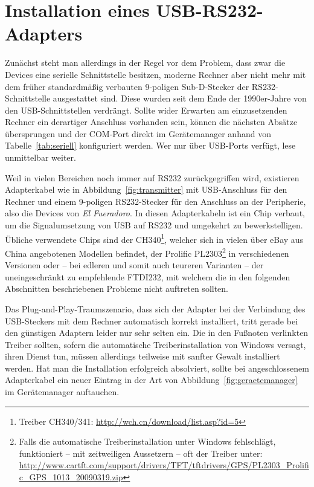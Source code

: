 \documentclass[pdftex, parskip, numbers=noenddot, toc=listof]{scrbook}
\newcommand{\anlage}{\emph{El Fueradoro}}
\begin{document}
		\section{Installation eines USB-RS232-Adapters}
			\label{sec:usbadapter}

			Zunächst steht man allerdings in der Regel vor dem Problem, dass zwar die Devices eine serielle Schnittstelle besitzen, moderne Rechner aber nicht mehr mit dem früher standardmäßig verbauten 9-poligen Sub-D-Stecker der RS232-Schnittstelle ausgestattet sind. Diese wurden seit dem Ende der 1990er-Jahre von den USB-Schnittstellen verdrängt. Sollte wider Erwarten am einzusetzenden Rechner ein derartiger Anschluss vorhanden sein, können die nächsten Absätze übersprungen und der COM-Port direkt im Gerätemanager anhand von Tabelle~\ref{tab:seriell} konfiguriert werden. Wer nur über USB-Ports verfügt, lese unmittelbar weiter.

			Weil in vielen Bereichen noch immer auf RS232 zurückgegriffen wird, existieren Adapterkabel wie in Abbildung~\ref{fig:transmitter} mit USB-Anschluss für den Rechner und einem 9-poligen RS232-Stecker für den Anschluss an der Peripherie, also die Devices von {\anlage}. In diesen Adapterkabeln ist ein Chip verbaut, um die Signalumsetzung von USB auf RS232 und umgekehrt zu bewerkstelligen. Übliche verwendete Chips sind der CH340\footnote{Treiber CH340/341: \url{http://wch.cn/download/list.asp?id=5}}, welcher sich in vielen über eBay aus China angebotenen Modellen befindet, der Prolific PL2303\footnote{Falls die automatische Treiberinstallation unter Windows fehlschlägt, funktioniert -- mit zeitweiligen Aussetzern -- oft der Treiber unter: \url{http://www.cartft.com/support/drivers/TFT/tftdrivers/GPS/PL2303_Prolific_GPS_1013_20090319.zip}} in verschiedenen Versionen oder -- bei edleren und somit auch teureren Varianten -- der uneingeschränkt zu empfehlende FTDI232, mit welchem die in den folgenden Abschnitten beschriebenen Probleme nicht auftreten sollten.

			Das Plug-and-Play-Traum\-szenario, dass sich der Adapter bei der Verbindung des USB-Steckers mit dem Rechner automatisch korrekt installiert, tritt gerade bei den günstigen Adaptern leider nur sehr selten ein. Die in den Fußnoten verlinkten Treiber sollten, sofern die automatische Treiberinstallation von Windows versagt, ihren Dienst tun, müssen allerdings teilweise mit sanfter Gewalt installiert werden. Hat man die Installation erfolgreich absolviert, sollte bei angeschlossenem Adapterkabel ein neuer Eintrag in der Art von Abbildung~\ref{fig:geraetemanager} im Gerätemanager auftauchen.
\end{document}
